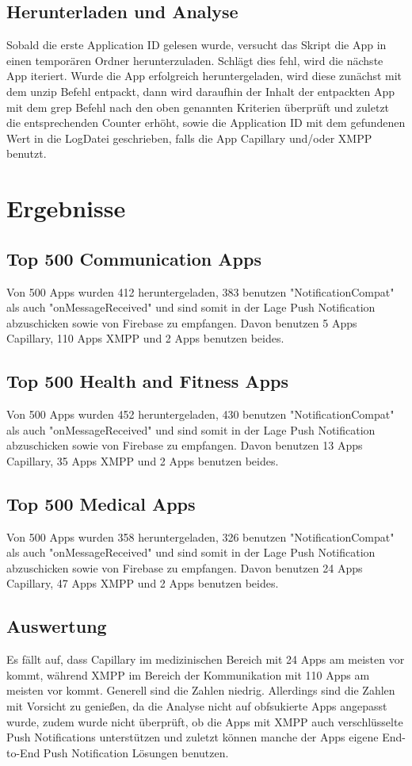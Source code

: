 \documentclass[sigconf]{acmart}
\begin{document}
\subsection{Herunterladen und Analyse}
Sobald die erste Application ID gelesen wurde, versucht das Skript die App 
in einen temporären Ordner herunterzuladen. Schlägt dies fehl, wird die 
nächste App iteriert. Wurde die App erfolgreich heruntergeladen, wird diese 
zunächst mit dem unzip Befehl entpackt, dann wird daraufhin der Inhalt der 
entpackten App mit dem grep Befehl nach den oben genannten Kriterien 
überprüft und zuletzt die entsprechenden Counter erhöht, sowie die 
Application ID mit dem gefundenen Wert in die LogDatei geschrieben, falls 
die App Capillary und/oder XMPP benutzt.

\section{Ergebnisse}

\subsection{Top 500 Communication Apps}
Von 500 Apps wurden 412 heruntergeladen, 383 benutzen "NotificationCompat" als auch "onMessageReceived" 
und sind somit in der Lage Push Notification abzuschicken sowie von Firebase zu empfangen. Davon benutzen 5 Apps Capillary, 110 Apps XMPP 
und 2 Apps benutzen beides.

\subsection{Top 500 Health and Fitness Apps}
Von 500 Apps wurden 452 heruntergeladen, 430 benutzen "NotificationCompat" als auch "onMessageReceived" 
und sind somit in der Lage Push Notification abzuschicken sowie von Firebase zu empfangen. Davon benutzen 13 Apps Capillary, 
35 Apps XMPP und 2 Apps benutzen beides.

\subsection{Top 500 Medical Apps}
Von 500 Apps wurden 358 heruntergeladen, 326 benutzen "NotificationCompat" als auch "onMessageReceived" 
und sind somit in der Lage Push Notification abzuschicken sowie von Firebase zu empfangen. Davon benutzen 24 Apps Capillary, 
47 Apps XMPP und 2 Apps benutzen beides.

\subsection{Auswertung}
Es fällt auf, dass Capillary im medizinischen Bereich mit 24 Apps am meisten vor kommt, während XMPP im Bereich
der Kommunikation mit 110 Apps am meisten vor kommt. Generell sind die Zahlen niedrig.
 Allerdings sind die Zahlen mit Vorsicht zu genießen, da die
Analyse nicht auf obfsukierte Apps angepasst wurde, zudem wurde nicht überprüft, ob die Apps mit XMPP auch verschlüsselte 
Push Notifications unterstützen und zuletzt können manche der Apps eigene End-to-End Push Notification Lösungen benutzen.



\end{document}
